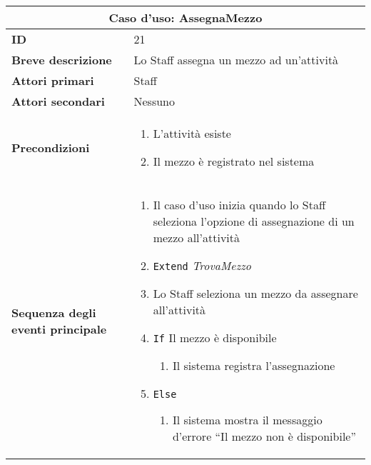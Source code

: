 \documentclass[a4paper]{report}
\begin{document}
\clearpage
\begin{table}[H]
\vspace*{-0cm}
\renewcommand{\arraystretch}{1.9}
\begin{tabular}{|p{3.9cm}|p{9.9cm}|}
\hline
\multicolumn{2}{|c|}{\textbf{Caso d’uso: AssegnaMezzo}} \\ \hline
	\textbf{ID} & 21 \\ \hline
	\textbf{Breve descrizione} & Lo Staff assegna un mezzo ad un’attività \\ \hline
	\textbf{Attori primari} & Staff \\ \hline
	\textbf{Attori secondari} & Nessuno \\ \hline
	\textbf{Precondizioni} & \begin{enumerate}[leftmargin=14pt,label=\arabic*.,labelsep=0.5em,topsep=0pt,partopsep=0pt,parsep=0pt,itemsep=0pt]
    \item L’attività esiste
    \item Il mezzo è registrato nel sistema
\end{enumerate} \\ \hline
	\textbf{Sequenza degli eventi principale} & \begin{enumerate}[leftmargin=14pt,label=\arabic*.,labelsep=0.5em,topsep=0pt,partopsep=0pt,parsep=0pt,itemsep=0pt]
    \item Il caso d'uso inizia quando lo Staff seleziona l'opzione di assegnazione di un mezzo all'attività
    \item \texttt{Extend} \textit{TrovaMezzo}
    \item Lo Staff seleziona un mezzo da assegnare all’attività
    \item \texttt{If} Il mezzo è disponibile
    \begin{enumerate}[label=\arabic{enumi}.\arabic*.,leftmargin=22pt,labelsep=0.5em,topsep=0pt,partopsep=0pt,parsep=0pt,itemsep=0pt]
        \item Il sistema registra l’assegnazione
    \end{enumerate}
    \item \texttt{Else}
    \begin{enumerate}[label=\arabic{enumi}.\arabic*.,leftmargin=22pt,labelsep=0.5em,topsep=0pt,partopsep=0pt,parsep=0pt,itemsep=0pt]
        \item Il sistema mostra il messaggio d’errore “Il mezzo non è disponibile”
    \end{enumerate}
\end{enumerate} \\ \hline

\end{tabular}
\end{table}
\end{document}

